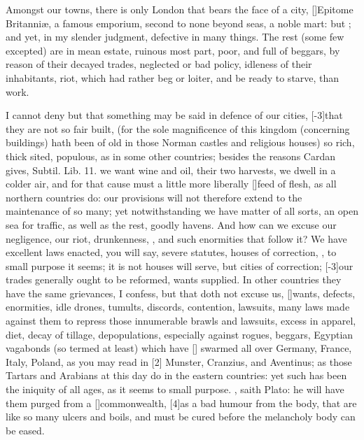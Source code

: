 {Amongst our towns, there is only London that bears the face of a
city, [\baselineskip]Epitome Britanni\ae{}, a famous emporium, second to none beyond
seas, a noble mart: but ; and yet, in
my slender judgment, defective in many things. The rest (some few
excepted) are in mean estate, ruinous most part, poor, and full of
beggars, by reason of their decayed trades, neglected or bad policy,
idleness of their inhabitants, riot, which had rather beg or loiter,
and be ready to starve, than work.

I cannot deny but that something may be said in defence of our cities,
[-3\baselineskip]that they are not so fair built, (for the sole magnificence of
this kingdom (concerning buildings) hath been of old in those Norman
castles and religious houses) so rich, thick sited, populous, as in
some other countries; besides the reasons Cardan gives, Subtil. Lib.
11. we want wine and oil, their two harvests, we dwell in a colder air,
and for that cause must a little more liberally [\baselineskip]feed of flesh, as
all northern countries do: our provisions will not therefore extend to
the maintenance of so many; yet notwithstanding we have matter of all
sorts, an open sea for traffic, as well as the rest, goodly havens. And
how can we excuse our negligence, our riot, drunkenness, \etc{}, and such
enormities that follow it? We have excellent laws enacted, you will
say, severe statutes, houses of correction, \etc{}, to small purpose it
seems; it is not houses will serve, but cities of correction; [-3\baselineskip]our
trades generally ought to be reformed, wants supplied. In other
countries they have the same grievances, I confess, but that doth not
excuse us, [\baselineskip]wants, defects, enormities, idle drones, tumults,
discords, contention, lawsuits, many laws made against them to repress
those innumerable brawls and lawsuits, excess in apparel, diet, decay
of tillage, depopulations, especially against rogues, beggars,
Egyptian vagabonds (so termed at least) which have [\baselineskip] swarmed all
over Germany, France, Italy, Poland, as you may read in [2\baselineskip] Munster,
Cranzius, and Aventinus; as those Tartars and Arabians at this day do
in the eastern countries: yet such has been the iniquity of all ages,
as it seems to small purpose. ,
 saith Plato: he will have them purged from a [\baselineskip]commonwealth,
[4\baselineskip]as a bad humour from the body, that are like so many ulcers and
boils, and must be cured before the melancholy body can be eased.

}
